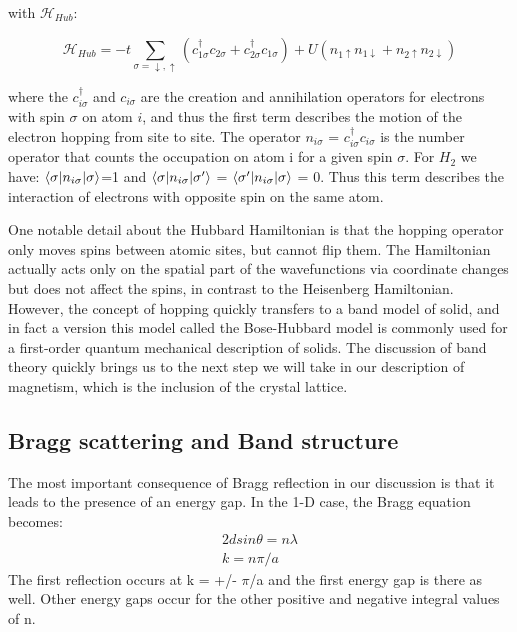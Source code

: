 with $\mathscr{H}_{Hub}$:

\begin{equation}
\mathscr{H}_{Hub}=-t\sum_{\sigma=\downarrow,\uparrow}(c^{\dagger}_{1\sigma}c_{2\sigma}+c^{\dagger}_{2\sigma}c_{1\sigma}) + U(n_{1\uparrow}n_{1\downarrow}+n_{2\uparrow}n_{2\downarrow})
\end{equation}

where the $c^{\dagger}_{i\sigma}$ and $c_{i\sigma}$ are the creation and annihilation operators for electrons with spin $\sigma$ on atom $i$, and thus the first term describes the motion of the electron hopping from site to site. The operator $n_{i\sigma}$ = $c^{\dagger}_{i\sigma}c_{i\sigma}$ is the number operator that counts the occupation on atom i for a given spin $\sigma$. For $H_2$ we have: $\braket{\sigma|n_{i\sigma}|\sigma}$=1 and $\braket{\sigma|n_{i\sigma}|\sigma'}$ = $\braket{\sigma'|n_{i\sigma}|\sigma}$ = 0. Thus this term describes the interaction of electrons with opposite spin on the same atom.

One notable detail about the Hubbard Hamiltonian is that the hopping operator only moves spins between atomic sites, but cannot flip them. The Hamiltonian actually acts only on the spatial part of the wavefunctions via coordinate changes but does not affect the spins, in contrast to the Heisenberg Hamiltonian. However, the concept of hopping quickly transfers to a band model of solid, and in fact a version this model called the Bose-Hubbard model is commonly used for a first-order quantum mechanical description of solids. The discussion of band theory quickly brings us to the next step we will take in our description of magnetism, which is the inclusion of the crystal lattice.

\subsection{Bragg scattering and Band structure}
The most important consequence of Bragg reflection in our discussion is that it leads to the presence of an energy gap. In the 1-D case, the Bragg equation becomes:
\begin{equation}
\begin{split}
2dsin\theta = n\lambda \\
k = n\pi/a
\end{split}
\end{equation}
The first reflection occurs at k = +/- $\pi$/a and the first energy gap is there as well. Other energy gaps occur for the other positive and negative integral values of n.


